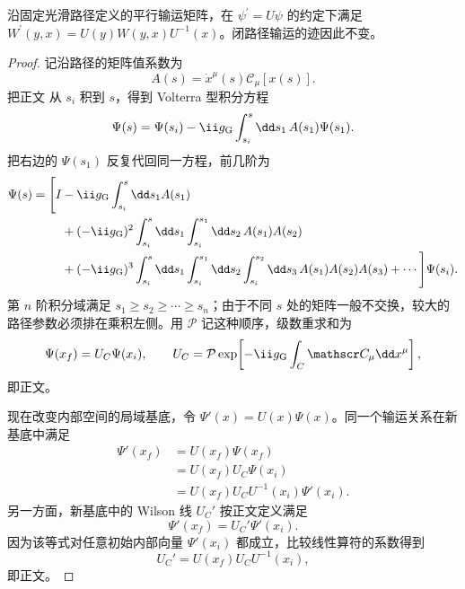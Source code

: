 \begin{proposition}
沿固定光滑路径定义的平行输运矩阵，在 $\psi^\prime=U\psi$ 的约定下满足 $W^\prime(y,x)=U(y)W(y,x)U^{-1}(x)$。闭路径输运的迹因此不变。
\end{proposition}
\begin{proof}
记沿路径的矩阵值系数为
\begin{equation*}
 A(s)=\dot x^\mu(s)\mathscr C_\mu[x(s)].
\end{equation*}
把正文 从 $s_i$ 积到 $s$，得到 Volterra 型积分方程
\begin{equation*}
 \Psi(s)=\Psi(s_i)-\ii g_{\rm G}\int_{s_i}^{s}\dd s_1\,A(s_1)\Psi(s_1).
\end{equation*}
把右边的 $\Psi(s_1)$ 反复代回同一方程，前几阶为
\begin{align*}
 \Psi(s)=\Bigg[I
 &-\ii g_{\rm G}\int_{s_i}^{s}\dd s_1A(s_1)\\
 &+(-\ii g_{\rm G})^2
 \int_{s_i}^{s}\dd s_1\int_{s_i}^{s_1}\dd s_2\,
 A(s_1)A(s_2)\\
 &+(-\ii g_{\rm G})^3
 \int_{s_i}^{s}\dd s_1\int_{s_i}^{s_1}\dd s_2
 \int_{s_i}^{s_2}\dd s_3\,
 A(s_1)A(s_2)A(s_3)+\cdots\Bigg]\Psi(s_i).
\end{align*}
第 $n$ 阶积分域满足 $s_1\ge s_2\ge\cdots\ge s_n$；由于不同 $s$ 处的矩阵一般不交换，较大的路径参数必须排在乘积左侧。用 $\mathcal P$ 记这种顺序，级数重求和为
\begin{equation*}
 \Psi(x_f)=U_C\Psi(x_i),\qquad
 U_C=\mathcal P\exp\!\left[-\ii g_{\rm G}\int_C\mathscr C_\mu\dd x^\mu\right],
\end{equation*}
即正文。

现在改变内部空间的局域基底，令 $\Psi'(x)=U(x)\Psi(x)$。同一个输运关系在新基底中满足
\begin{align*}
 \Psi'(x_f)
 &=U(x_f)\Psi(x_f)\\
 &=U(x_f)U_C\Psi(x_i)\\
 &=U(x_f)U_CU^{-1}(x_i)\Psi'(x_i).
\end{align*}
另一方面，新基底中的 Wilson 线 $U_C'$ 按正文定义满足
\begin{equation*}
 \Psi'(x_f)=U_C'\Psi'(x_i).
\end{equation*}
因为该等式对任意初始内部向量 $\Psi'(x_i)$ 都成立，比较线性算符的系数得到
\begin{equation*}
 U_C'=U(x_f)U_CU^{-1}(x_i),
\end{equation*}
即正文。
\end{proof}

